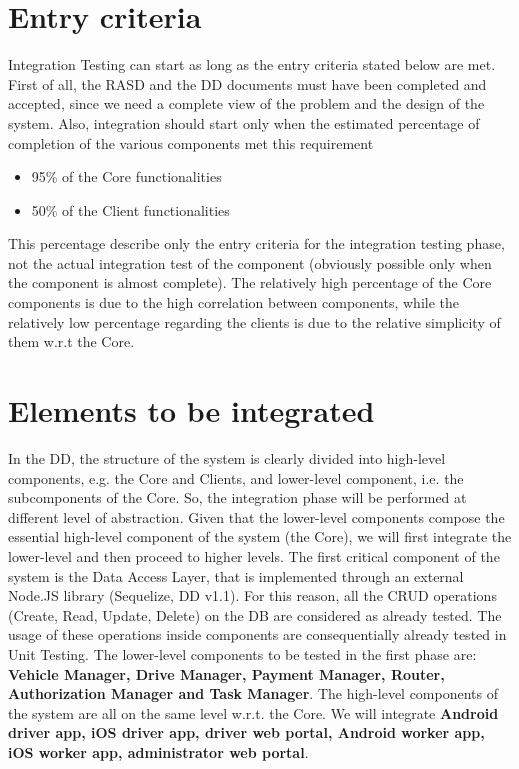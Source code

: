 \section{Entry criteria}
Integration Testing can start as long as the entry criteria stated below are met. First of all, the RASD and the DD documents must have been completed and accepted, since we need a complete view of the problem and the design of the system. \newline
Also, integration should start only when the estimated percentage of completion of the various components met this requirement
\begin{itemize}
\item 95\% of the Core functionalities
\item 50\% of the Client functionalities
\end{itemize}
This percentage describe only the entry criteria for the integration testing phase, not the actual integration test of the component (obviously possible only when the component is almost complete). The relatively high percentage of the Core components is due to the high correlation between components, while the relatively low percentage regarding the clients is due to the relative simplicity of them w.r.t the Core.

\section{Elements to be integrated}
In the DD, the structure of the system is clearly divided into high-level components, e.g. the Core and Clients, and lower-level component, i.e. the subcomponents of the Core. So, the integration phase will be performed at different level of abstraction. Given that the lower-level components compose the essential high-level component of the system (the Core), we will first integrate the lower-level and then proceed to higher levels. \newline
The first critical component of the system is the Data Access Layer, that is implemented through an external Node.JS library (Sequelize, DD v1.1). For this reason, all the CRUD operations (Create, Read, Update, Delete) on the DB are considered as already tested. The usage of these operations inside components are consequentially already tested in Unit Testing.
The lower-level components to be tested in the first phase are: \textbf{Vehicle Manager, Drive Manager, Payment Manager, Router, Authorization Manager and Task Manager}.
\newline
The high-level components of the system are all on the same level w.r.t. the Core. We will integrate \textbf{Android driver app, iOS driver app, driver web portal, Android worker app, iOS worker app, administrator web portal}.

